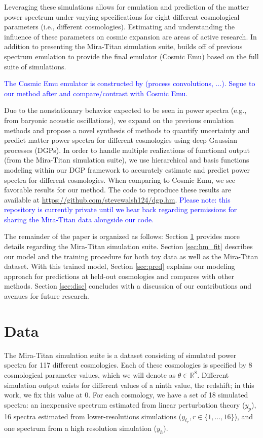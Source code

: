 \documentclass[11pt]{article}
\begin{document}
Leveraging these simulations allows for emulation and prediction of the matter power spectrum under varying specifications for eight different cosmological parameters (i.e., different cosmologies). Estimating and understanding the influence of these parameters on cosmic expansion are areas of active research. In addition to presenting the Mira-Titan simulation suite, \cite{moran2023mira} builds off of previous spectrum emulation \citep{lawrence2017mira} to provide the final emulator (Cosmic Emu) based on the full suite of simulations.

\textcolor{blue}{The Cosmic Emu emulator is constructed by (process convolutions, ...). Segue to our method after and compare/contrast with Cosmic Emu.}

Due to the nonstationary behavior expected to be seen in power spectra (e.g., from baryonic acoustic oscillations), we expand on the previous emulation methods and propose a novel synthesis of methods to quantify uncertainty and predict matter power spectra for different cosmologies using deep Gaussian processes (DGPs). In order to handle multiple realizations of functional output (from the Mira-Titan simulation suite), we use hierarchical and basis functions modeling within our DGP framework to accurately estimate and predict power spectra for different cosmologies. When comparing to Cosmic Emu, we see favorable results for our method. The code to reproduce these results are available at \url{https://github.com/stevewalsh124/dgp.hm}. \textcolor{blue}{Please note: this repository is currently private until we hear back regarding permissions for sharing the Mira-Titan data alongside our code.}

The remainder of the paper is organized as follows: Section \ref{sec:data} provides more details regarding the Mira-Titan simulation suite. Section \ref{sec:hm_fit} describes our model and the training procedure for both toy data as well as the Mira-Titan dataset. With this trained model, Section \ref{sec:pred} explains our modeling approach for predictions at held-out cosmologies and compares with other methods. Section \ref{sec:disc} concludes with a discussion of our contributions and avenues for future research.

\section{Data}
\label{sec:data}

The Mira-Titan simulation suite is a dataset consisting of simulated power spectra for 117 different cosmologies. Each of these cosmologies is specified by 8 cosmological parameter values, which we will denote as $\theta \in \mathbb{R}^8$. Different simulation output exists for different values of a ninth value, the redshift; in this work, we fix this value at 0. For each cosmology, we have a set of 18 simulated spectra: an inexpensive spectrum estimated from linear perturbation theory ($y_p$), 16 spectra estimated from lower-resolutions simulations ($y_{\ell_r}, r \in \{1,\dots,16\}$), and one spectrum from a high resolution simulation ($y_h$). 
\end{document}
